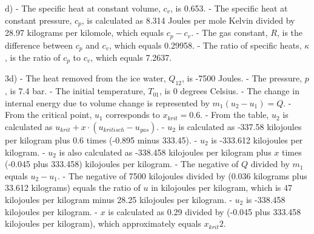 d) 
- The specific heat at constant volume, \( c_v \), is 0.653.
- The specific heat at constant pressure, \( c_p \), is calculated as 8.314 Joules per mole Kelvin divided by 28.97 kilograms per kilomole, which equals \( c_p - c_v \).
- The gas constant, \( R \), is the difference between \( c_p \) and \( c_v \), which equals 0.29958.
- The ratio of specific heats, \( \kappa \), is the ratio of \( c_p \) to \( c_v \), which equals 7.2637.

3d)
- The heat removed from the ice water, \( Q_{12} \), is -7500 Joules.
- The pressure, \( p \), is 7.4 bar.
- The initial temperature, \( T_{01} \), is 0 degrees Celsius.
- The change in internal energy due to volume change is represented by \( m_1 (u_2 - u_1) = Q \).
- From the critical point, \( u_1 \) corresponds to \( x_{krit} = 0.6 \).
- From the table, \( u_2 \) is calculated as \( u_{krit} + x \cdot (u_{kritisch} - u_{gas}) \).
- \( u_2 \) is calculated as -337.58 kilojoules per kilogram plus 0.6 times (-0.895 minus 333.45).
- \( u_2 \) is -333.612 kilojoules per kilogram.
- \( u_2 \) is also calculated as -338.458 kilojoules per kilogram plus \( x \) times (-0.045 plus 333.458) kilojoules per kilogram.
- The negative of \( Q \) divided by \( m_1 \) equals \( u_2 - u_1 \).
- The negative of 7500 kilojoules divided by (0.036 kilograms plus 33.612 kilograms) equals the ratio of \( u \) in kilojoules per kilogram, which is 47 kilojoules per kilogram minus 28.25 kilojoules per kilogram.
- \( u_2 \) is -338.458 kilojoules per kilogram.
- \( x \) is calculated as 0.29 divided by (-0.045 plus 333.458 kilojoules per kilogram), which approximately equals \( x_{krit} 2 \).